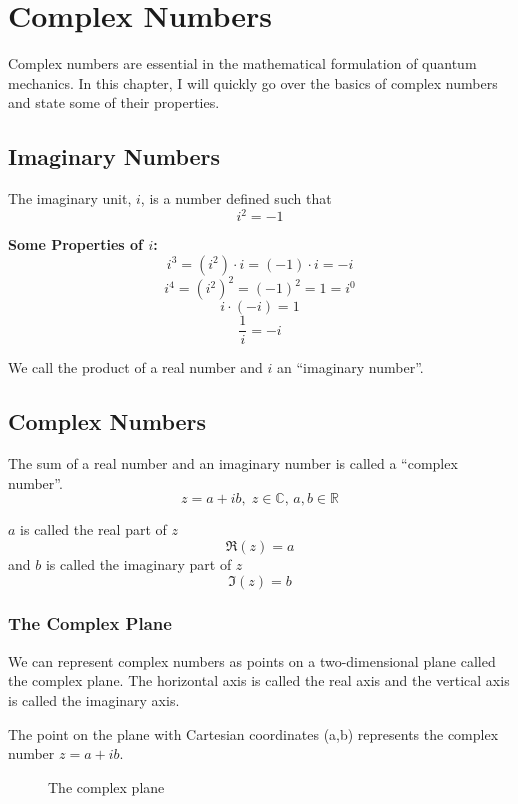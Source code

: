 \chapter{Complex Numbers}

Complex numbers are essential in the mathematical formulation of quantum mechanics. In this chapter,
I will quickly go over the basics of complex numbers and state some of their properties.

\section{Imaginary Numbers}
The imaginary unit, \(i\), is a number defined such that
\[ i^2 = -1 \]

\textbf{Some Properties of $i$:}
\[i^3 = (i^2)\cdot i = (-1)\cdot i = -i\]
\[i^4 = {(i^2)}^2 = (-1)^2 = 1 = i^0\]
\[i\cdot(-i) = 1 \]
\[\frac{1}{i} = -i\]

We call the product of a real number and $i$ an ``imaginary number''.

\section{Complex Numbers}
The sum of a real number and an imaginary number is called a ``complex number''.
\[ z = a + ib,\; z\in\mathbb{C},\, a,b \in \mathbb{R}\]

\(a\) is called the real part of \(z\)
\[\Re(z) = a\] 
and \(b\) is called the imaginary part of \(z\)
\[\Im(z) = b\]

\subsection{The Complex Plane}
We can represent complex numbers as points on a two-dimensional plane called the complex plane. The 
horizontal axis is called the real axis and the vertical axis is called the imaginary axis.

The point on the plane with Cartesian coordinates (a,b) represents the complex number \(z=a+ib\).

\begin{figure}[h]
    \centering 
    \caption{The complex plane}
\end{figure}

